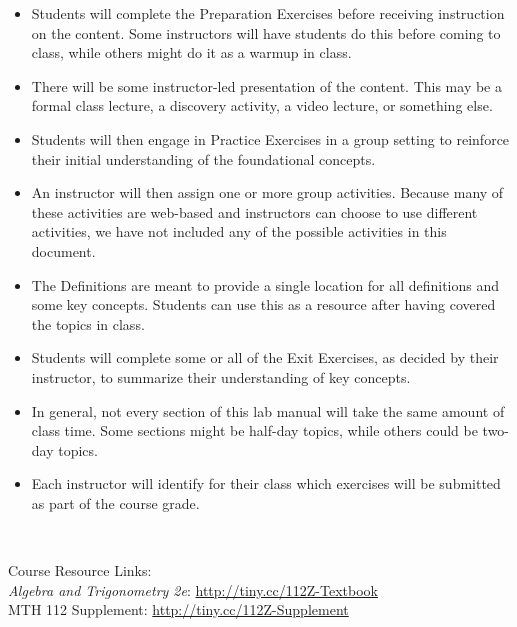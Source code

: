 \begin{itemize}
	\item Students will complete the Preparation Exercises before receiving instruction on the content.  Some instructors will have students do this before coming to class, while others might do it as a warmup in class.
	\item There will be some instructor-led presentation of the content.  This may be a formal class lecture, a discovery activity, a video lecture, or something else.
	\item Students will then engage in Practice Exercises in a group setting to reinforce their initial understanding of the foundational concepts.
	\item An instructor will then assign one or more group activities.  Because many of these activities are web-based and instructors can choose to use different activities, we have not included any of the possible activities in this document. 
	\item The Definitions are meant to provide a single location for all definitions and some key concepts.  Students can use this as a resource after having covered the topics in class.
	\item Students will complete some or all of the Exit Exercises, as decided by their instructor, to summarize their understanding of key concepts.
	\item In general, not every section of this lab manual will take the same amount of class time.  Some sections might be half-day topics, while others could be two-day topics.	
	\item Each instructor will identify for their class which exercises will be submitted as part of the course grade.
\end{itemize}
~

Course Resource Links:\\
{\it Algebra and Trigonometry 2e}:  \href{http://tiny.cc/111Z-Textbook}{http://tiny.cc/112Z-Textbook}\\
MTH 112 Supplement: \href{http://tiny.cc/111Z-Supplement}{http://tiny.cc/112Z-Supplement}

\newpage
~